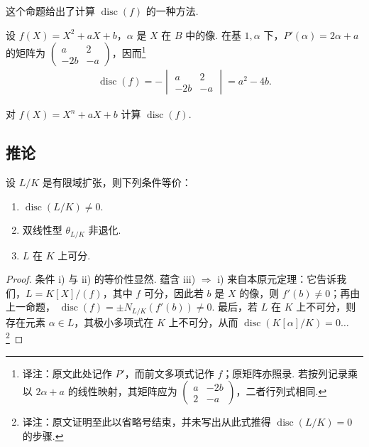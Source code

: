 这个命题给出了计算 $\operatorname{disc}(f)$ 的一种方法.
\begin{example*}
设 $f(X)=X^2+aX+b$，$\alpha$ 是 $X$ 在 $B$ 中的像. 在基 $1,\alpha$ 下，$P'(\alpha)=2\alpha+a$ 的矩阵为
$\left(\begin{smallmatrix}a&2\\-2b&-a\end{smallmatrix}\right)$，因而\footnote{译注：原文此处记作 $P'$，而前文多项式记作 $f$；原矩阵亦照录. 若按列记录乘以 $2\alpha+a$ 的线性映射，其矩阵应为 $\left(\begin{smallmatrix}a&-2b\\2&-a\end{smallmatrix}\right)$，二者行列式相同.}
\begin{align*}
\operatorname{disc}(f)=-\begin{vmatrix}a&2\\-2b&-a\end{vmatrix}=a^2-4b.
\end{align*}
\end{example*}
\begin{exercise*}
对 $f(X)=X^n+aX+b$ 计算 $\operatorname{disc}(f)$.
\end{exercise*}

\subsection{推论}\label{sec:nt-2-4-5}
\begin{corollary*}
设 $L/K$ 是有限域扩张，则下列条件等价：
\begin{enumerate}[label=\roman*)]
\item $\operatorname{disc}(L/K)\ne0$.
\item 双线性型 $\theta_{L/K}$ 非退化.
\item $L$ 在 $K$ 上可分.
\end{enumerate}
\end{corollary*}
\begin{proof}
条件 i) 与 ii) 的等价性显然. 蕴含 iii) $\Rightarrow$ i) 来自本原元定理：它告诉我们，$L=K[X]/(f)$，其中 $f$ 可分，因此若 $b$ 是 $X$ 的像，则 $f'(b)\ne0$；再由上一命题，
$\operatorname{disc}(f)=\pm N_{L/K}(f'(b))\ne0$.
最后，若 $L$ 在 $K$ 上不可分，则存在元素 $\alpha\in L$，其极小多项式在 $K$ 上不可分，从而 $\operatorname{disc}(K[\alpha]/K)=0\ldots$\footnote{译注：原文证明至此以省略号结束，并未写出从此式推得 $\operatorname{disc}(L/K)=0$ 的步骤.}
\end{proof}

